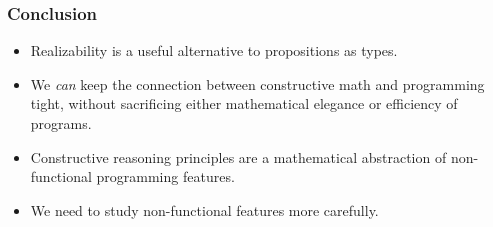 \documentclass[t]{beamer}
\begin{document}
\begin{frame}
  \frametitle{Conclusion}

  \begin{itemize}
  \item Realizability is a useful alternative to propositions as
    types.
  \item We \emph{can} keep the connection between constructive math
    and programming tight, without sacrificing either mathematical
    elegance or efficiency of programs.
  \item Constructive reasoning principles are a mathematical
    abstraction of non-functional programming features.
  \item We need to study non-functional features more carefully.
  \end{itemize}

\end{frame}
\end{document}
